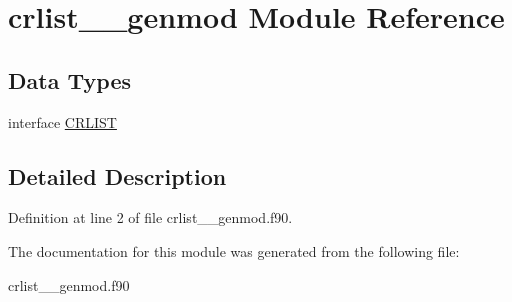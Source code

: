 \hypertarget{classcrlist____genmod}{\section{crlist\+\_\+\+\_\+genmod Module Reference}
\label{classcrlist____genmod}
}
\subsection*{Data Types}
\begin{DoxyCompactItemize}
\item 
interface \hyperlink{interfacecrlist____genmod_1_1_c_r_l_i_s_t}{C\+R\+L\+I\+S\+T}
\end{DoxyCompactItemize}


\subsection{Detailed Description}


Definition at line 2 of file crlist\+\_\+\+\_\+genmod.\+f90.



The documentation for this module was generated from the following file\+:\begin{DoxyCompactItemize}
\item 
crlist\+\_\+\+\_\+genmod.\+f90\end{DoxyCompactItemize}
